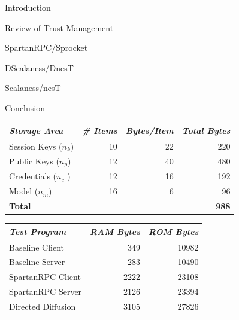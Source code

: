 
\begin{cenumerate}
\item Introduction
\item Review of Trust Management
\item SpartanRPC/Sprocket
\item DScalaness/DnesT
\item Scalaness/nesT
\item {}
\item Conclusion
\end{cenumerate}
\stopslide


\centering
  \begin{tabular}{|l|r|r|r|} \hline
    \textit{Storage Area} \T & \textit{\# Items} & \textit{Bytes/Item} & \textit{Total Bytes} \\
    \hline \hline

    Session Keys ($n_k$) \T & 10 & 22 & 220 \\ \hline 
    Public Keys ($n_p$)  \T & 12 & 40 & 480 \\ \hline
    Credentials ($n_c$ ) \T & 12 & 16 & 192 \\ \hline
    Model ($n_m$)        \T & 16 &  6 &  96 \\ \hline \hline
    \textbf{Total} \T & \multicolumn{3}{r|}{ \textbf{988} } \\ \hline
  \end{tabular}
\stopslide


\centering
  \begin{tabular}{|l|r|r|} \hline
    \textit{Test Program} \T & \textit{RAM Bytes} & \textit{ROM Bytes} \\
    \hline \hline

    Baseline Client    \T &  349 & 10982 \\ \hline 
    Baseline Server    \T &  283 & 10490 \\ \hline
    SpartanRPC Client  \T & 2222 & 23108 \\ \hline
    SpartanRPC Server  \T & 2126 & 23394 \\ \hline
    Directed Diffusion \T & 3105 & 27826 \\ \hline
  \end{tabular}
\stopslide


